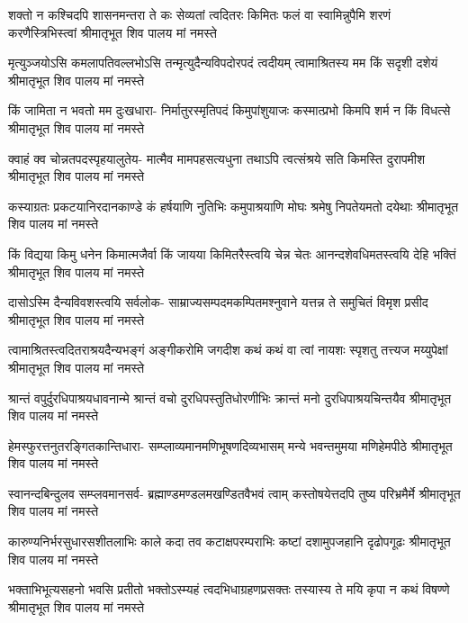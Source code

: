 \fourlineindentedshloka
{शक्तो न कश्चिदपि शासनमन्तरा ते}
{कः सेव्यतां त्वदितरः किमितः फलं वा}
{स्वामिन्नुपैमि शरणं करणैस्त्रिभिस्त्वां}
{श्रीमातृभूत शिव पालय मां नमस्ते} %

\fourlineindentedshloka
{मृत्युञ्जयोऽसि कमलापतिवल्लभोऽसि}
{तन्मृत्युदैन्यविपदोरपदं त्वदीयम्}
{त्वामाश्रितस्य मम किं सदृशी दशेयं}
{श्रीमातृभूत शिव पालय मां नमस्ते} %

\fourlineindentedshloka
{किं जामिता न भवतो मम दुःखधारा-}
{निर्मातुरस्मृतिपदं किमुपांशुयाजः}
{कस्मात्प्रभो किमपि शर्म न किं विधत्से}
{श्रीमातृभूत शिव पालय मां नमस्ते} %

\fourlineindentedshloka
{क्वाहं क्व चोन्नतपदस्पृहयालुतेय-}
{मात्मैव मामपहसत्यधुना तथाऽपि}
{त्वत्संश्रये सति किमस्ति दुरापमीश}
{श्रीमातृभूत शिव पालय मां नमस्ते} %

\fourlineindentedshloka
{कस्याग्रतः प्रकटयानिरदानकाण्डे}
{कं हर्षयाणि नुतिभिः कमुपाश्रयाणि}
{मोघः श्रमेषु निपतेयमतो दयेथाः}
{श्रीमातृभूत शिव पालय मां नमस्ते} %

\fourlineindentedshloka
{किं विद्यया किमु धनेन किमात्मजैर्वा}
{किं जायया किमितरैस्त्वयि चेन्न चेतः}
{आनन्दशेवधिमतस्त्वयि देहि भक्तिं}
{श्रीमातृभूत शिव पालय मां नमस्ते} %

\fourlineindentedshloka
{दासोऽस्मि दैन्यविवशस्त्वयि सर्वलोक-}
{साम्राज्यसम्पदमकम्पितमश्नुवाने}
{यत्तन्न ते समुचितं विमृश प्रसीद}
{श्रीमातृभूत शिव पालय मां नमस्ते} %

\fourlineindentedshloka
{त्वामाश्रितस्त्वदितराश्रयदैन्यभङ्गं}
{अङ्गीकरोमि जगदीश कथं कथं वा}
{त्वां नायशः स्पृशतु तत्त्यज मय्युपेक्षां}
{श्रीमातृभूत शिव पालय मां नमस्ते} %

\fourlineindentedshloka
{श्रान्तं वपुर्दुरधिपाश्रयधावनान्मे}
{श्रान्तं वचो दुरधिपस्तुतिधोरणीभिः}
{क्रान्तं मनो दुरधिपाश्रयचिन्तयैव}
{श्रीमातृभूत शिव पालय मां नमस्ते} %

\fourlineindentedshloka
{हेमस्फुरत्तनुतरङ्गितकान्तिधारा-}
{सम्प्लाव्यमानमणिभूषणदिव्यभासम्}
{मन्ये भवन्तमुमया मणिहेमपीठे}
{श्रीमातृभूत शिव पालय मां नमस्ते} %

\fourlineindentedshloka
{स्वानन्दबिन्दुलव सम्प्लवमानसर्व-}
{ब्रह्माण्डमण्डलमखण्डितवैभवं त्वाम्}
{कस्तोषयेत्तदपि तुष्य परिभ्रमैर्मे}
{श्रीमातृभूत शिव पालय मां नमस्ते} %

\fourlineindentedshloka
{कारुण्यनिर्भरसुधारसशीतलाभिः}
{काले कदा तव कटाक्षपरम्पराभिः}
{कष्टां दशामुपजहानि दृढोपगूढः}
{श्रीमातृभूत शिव पालय मां नमस्ते} %

\fourlineindentedshloka
{भक्ताभिभूत्यसहनो भवसि प्रतीतो}
{भक्तोऽस्म्यहं त्वदभिधाग्रहणप्रसक्तः}
{तस्यास्य ते मयि कृपा न कथं विषण्णे}
{श्रीमातृभूत शिव पालय मां नमस्ते} %

